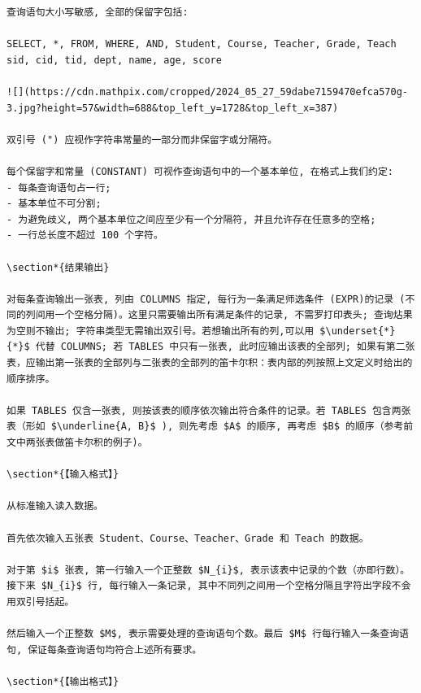 \documentclass[10pt]{article}
\begin{document}
\begin{verbatim}
查询语句大小写敏感, 全部的保留字包括:

SELECT, *, FROM, WHERE, AND, Student, Course, Teacher, Grade, Teach sid, cid, tid, dept, name, age, score

![](https://cdn.mathpix.com/cropped/2024_05_27_59dabe7159470efca570g-3.jpg?height=57&width=688&top_left_y=1728&top_left_x=387)

双引号 (") 应视作字符串常量的一部分而非保留字或分隔符。

每个保留字和常量 (CONSTANT) 可视作查询语句中的一个基本单位, 在格式上我们约定:
- 每条查询语句占一行;
- 基本单位不可分割;
- 为避免歧义, 两个基本单位之间应至少有一个分隔符, 并且允许存在任意多的空格;
- 一行总长度不超过 100 个字符。

\section*{结果输出}

对每条查询输出一张表, 列由 COLUMNS 指定, 每行为一条满足师选条件 (EXPR)的记录 (不同的列间用一个空格分隔)。这里只需要输出所有满足条件的记录, 不需罗打印表头; 查询炶果为空则不输出; 字符串类型无需输出双引号。若想输出所有的列,可以用 $\underset{*}{*}$ 代替 COLUMNS; 若 TABLES 中只有一张表, 此时应输出该表的全部列; 如果有第二张表，应输出第一张表的全部列与二张表的全部列的笛卡尔积：表内部的列按照上文定义时给出的顺序排序。

如果 TABLES 仅含一张表, 则按该表的顺序依次输出符合条件的记录。若 TABLES 包含两张表（形如 $\underline{A, B}$ ), 则先考虑 $A$ 的顺序, 再考虑 $B$ 的顺序（参考前文中两张表做笛卡尔积的例子)。

\section*{【输入格式】}

从标准输入读入数据。

首先依次输入五张表 Student、Course、Teacher、Grade 和 Teach 的数据。

对于第 $i$ 张表, 第一行输入一个正整数 $N_{i}$, 表示该表中记录的个数（亦即行数）。接下来 $N_{i}$ 行, 每行输入一条记录, 其中不同列之间用一个空格分隔且字符出字段不会用双引号括起。

然后输入一个正整数 $M$, 表示需要处理的查询语句个数。最后 $M$ 行每行输入一条查询语句, 保证每条查询语句均符合上述所有要求。

\section*{【输出格式】}


\end{verbatim}
\end{document}
